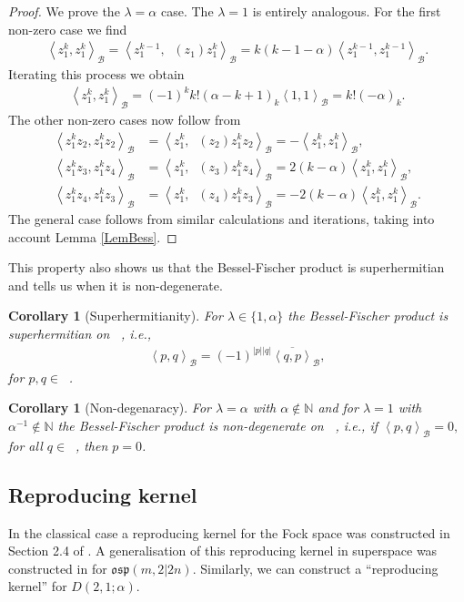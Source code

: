 \documentclass{amsart}
\numberwithin{theorem}{section}
\newtheorem{Cor}[theorem]{Corollary}
\theoremstyle{definition}
\theoremstyle{remark}
\def\N{\mathds{N} }
\DeclareMathOperator{\bessel}{\mathcal B_\lambda}
\DeclareMathOperator{\Fock}{\mc F_\lambda}
\newcommand{\bfip}[1]{\left<{#1}\right>_\mathcal B}
\newcommand{\bfipbar}[1]{\overline{\left<{#1}\right>}_\mathcal B}
\newcommand{\mf}[1]{\mathfrak{#1}}
\newcommand{\mc}[1]{\mathcal{#1}}
\begin{document}
\begin{proof}
We prove the $\lambda=\alpha$ case. The $\lambda =1$ is entirely analogous. For the first non-zero case we find
\begin{align*}
\bfip{z_1^{k}, z_1^{k}} = \bfip{z_1^{k-1}, \bessel(z_1)z_1^{k}} = k(k-1-\alpha)\bfip{z_1^{k-1}, z_1^{k-1}}.
\end{align*}
Iterating this process we obtain
\begin{align*}
\bfip{z_1^{k}, z_1^{k}} = (-1)^{k}k!(\alpha-k+1)_{k}\bfip{1,1} = k!(-\alpha)_{k}.
\end{align*}
The other non-zero cases now follow from
\begin{align*}
\bfip{z_1^{k}z_2, z_1^{k}z_2} &= \bfip{z_1^k, \bessel(z_2)z_1^{k}z_2} = -\bfip{z_1^k, z_1^k},\\
\bfip{z_1^{k}z_3, z_1^{k}z_4} &= \bfip{z_1^k, \bessel(z_3)z_1^{k}z_4} = 2(k-\alpha)\bfip{z_1^k, z_1^k},\\
\bfip{z_1^{k}z_4, z_1^{k}z_3} &= \bfip{z_1^k, \bessel(z_4)z_1^{k}z_3} = -2(k-\alpha)\bfip{z_1^k, z_1^k}.
\end{align*}
The general case follows from similar calculations and iterations, taking into account Lemma \ref{LemBess}.
\end{proof}

This property also shows us that the Bessel-Fischer product is superhermitian and tells us when it is non-degenerate.

\begin{Cor}[Superhermitianity]
For $\lambda\in\{1,\alpha\}$ the Bessel-Fischer product is superhermitian on $\Fock$, i.e.,
\begin{align*}
\bfip{p, q} = (-1)^{\left|p\right|\left|q\right|}\bfipbar{q, p},
\end{align*}
for $p, q\in \Fock$.
\end{Cor}

\begin{Cor}[Non-degenaracy]\label{nondeg}
For $\lambda=\alpha$ with $\alpha\not\in \N$ and for $\lambda=1$ with $\alpha^{-1}\not\in \N$ the Bessel-Fischer product is non-degenerate on $\Fock$, i.e., if
$
\bfip{p,q} =0,
$
for all $q\in \Fock$, then $p=0$.
\end{Cor}

\subsection{Reproducing kernel}\label{SSRepKer}

In the classical case a reproducing kernel for the Fock space was constructed in Section 2.4 of \cite{HKMO}. A generalisation of this reproducing kernel in superspace was constructed in \cite{BCD} for $\mf{osp}(m,2|2n)$. Similarly, we can construct a ``reproducing kernel'' for $D(2,1;\alpha)$.
\end{document}
